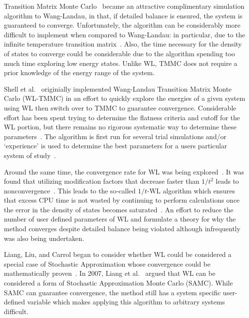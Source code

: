 \documentclass[letterpaper,twocolumn,amsmath,amssymb,pre,aps,10pt]{revtex4-1}
\begin{document}
Transition Matrix Monte Carlo~\cite{wang1999transition,
swendsen1999transition, fitzgerald2000monte} became an attractive
complimentary simulation algorithm to Wang-Landau, in that, if detailed
balance is ensured, the system is guaranteed to converge.  Unfortunately,
the algorithm can be considerably more difficult to implement when
compared to Wang-Landau: in particular, due to the infinite temperature
transition matrix~\cite{wang2002transition}.  Also, the time necessary
for the density of states to converge could be considerable
due to the algorithm spending too much time exploring low energy states.
Unlike WL, TMMC does not require a prior knowledge of the energy range of
the system.

Shell et al.~\cite{shell2003improved, shell2004flat} originially
implemented Wang-Landau Transition Matrix Monte Carlo (WL-TMMC) in an
effort to quickly explore the energies of a given system using WL then
switch over to TMMC to guarantee convergence. Considerable effort has
been spent trying to determine the flatness criteria and cutoff for the
WL portion, but there remains no rigorous systematic way to determine
these parameters~\cite{rane2013monte}.  The algorithm is first run for
several trial simulations and/or `experience' is used to determine the
best parameters for a users particular system of
study~\cite{siderius2013use}.

Around the same time, the convergence rate for WL was being
explored~\cite{zhou2005understanding,lee2006convergence,
belardinelli2007wang}. It was found that utilizing modification factors
that decrease faster than $1/t^2$ leads to
nonconvergence~\cite{belardinelli2007fast}.  This leads to the so-called
$1/t$-WL algorithm which ensures that excess CPU time is not wasted by
continuing to perform calculations once the error in the density of
states becomes saturated~\cite{belardinelli2008analysis}. An effort to
reduce the number of user defined parameters of WL and formulate a
theory for why the method converges despite detailed balance being
violated although infrequently was also being undertaken.

Liang, Liu, and Carrol began to consider whether WL could be considered
a special case of Stochastic Approximation whose convergence could be
mathematically proven~\cite{liang2006theory, liang2007stochastic}. In
2007, Liang et al.~\cite{liang2007stochastic} argued that WL can be
considered a form of Stochastic Approximation Monte Carlo (SAMC). While
SAMC can guarantee convergence, the method still has a system specific
user-defined variable which makes applying this algorithm to arbitrary
systems difficult.
\end{document}
